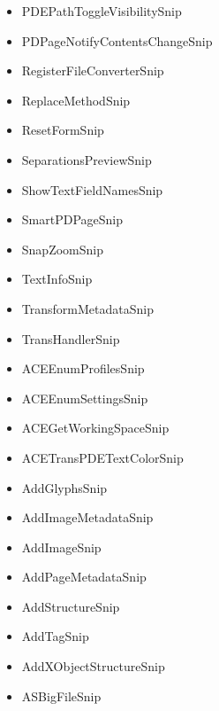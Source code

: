 \documentclass[letterpaper,12pt,english,openany,oneside]{sphinxmanual}
\begin{document}
\begin{itemize}
\item {} 
PDEPathToggleVisibilitySnip

\item {} 
PDPageNotifyContentsChangeSnip

\item {} 
RegisterFileConverterSnip

\item {} 
ReplaceMethodSnip

\item {} 
ResetFormSnip

\item {} 
SeparationsPreviewSnip

\item {} 
ShowTextFieldNamesSnip

\item {} 
SmartPDPageSnip

\item {} 
SnapZoomSnip

\item {} 
TextInfoSnip

\item {} 
TransformMetadataSnip

\item {} 
TransHandlerSnip

\item {} 
ACEEnumProfilesSnip

\item {} 
ACEEnumSettingsSnip

\item {} 
ACEGetWorkingSpaceSnip

\item {} 
ACETransPDETextColorSnip

\item {} 
AddGlyphsSnip

\item {} 
AddImageMetadataSnip

\item {} 
AddImageSnip

\item {} 
AddPageMetadataSnip

\item {} 
AddStructureSnip

\item {} 
AddTagSnip

\item {} 
AddXObjectStructureSnip

\item {} 
ASBigFileSnip


\end{itemize}
\end{document}
